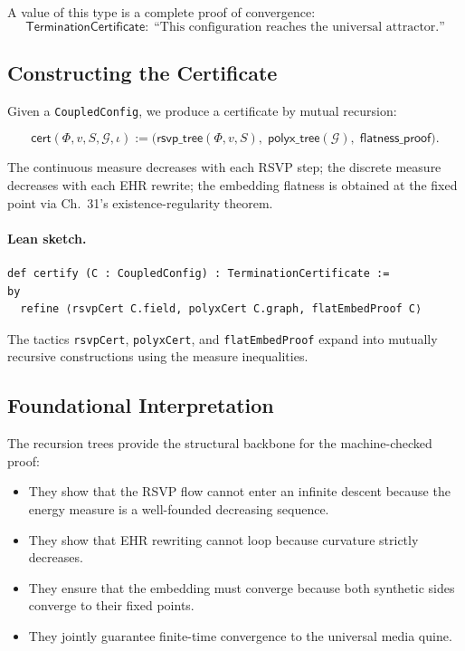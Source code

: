 A value of this type is a complete proof of convergence:
\[
   \mathsf{TerminationCertificate}
    :\;\text{``This configuration reaches the universal attractor.''}
\]

\subsection{Constructing the Certificate}

Given a \texttt{CoupledConfig}, we produce a certificate by mutual recursion:

\[
   \mathsf{cert}(\Phi,v,S,\mathcal{G},\iota)
    := \bigl( \mathsf{rsvp\_tree}(\Phi,v,S),\;
              \mathsf{polyx\_tree}(\mathcal{G}),\;
              \mathsf{flatness\_proof} \bigr).
\]

The continuous measure decreases with each RSVP step;  
the discrete measure decreases with each EHR rewrite;  
the embedding flatness is obtained at the fixed point via Ch.~31’s existence-regularity theorem.

\paragraph{Lean sketch.}

\begin{verbatim}
def certify (C : CoupledConfig) : TerminationCertificate :=
by
  refine ⟨rsvpCert C.field, polyxCert C.graph, flatEmbedProof C⟩
\end{verbatim}

The tactics \texttt{rsvpCert}, \texttt{polyxCert}, and \texttt{flatEmbedProof} expand into mutually recursive constructions using the measure inequalities.

\subsection{Foundational Interpretation}

The recursion trees provide the structural backbone for the machine-checked proof:

\begin{itemize}
\item They show that the RSVP flow cannot enter an infinite descent because the energy measure is a well-founded decreasing sequence.

\item They show that EHR rewriting cannot loop because curvature strictly decreases.

\item They ensure that the embedding must converge because both synthetic sides converge to their fixed points.

\item They jointly guarantee finite-time convergence to the universal media quine.
\end{itemize}

